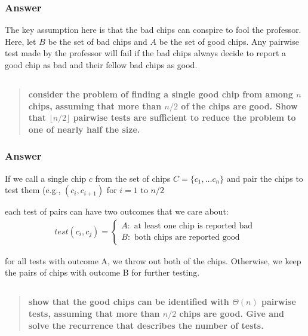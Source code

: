 \documentclass[titlepage]{article}\usepackage[]{graphicx}\usepackage[]{color}
\begin{document}
\subsubsection{Answer}
The key assumption here is that the bad chips can conspire to fool the professor.
Here, let $B$ be the set of bad chips and $A$ be the set of good chips. Any
pairwise test made by the professor will fail if the bad chips always decide to
report a good chip as bad and their fellow bad chips as good. 

  \subsection{ }
  \begin{quote}
  \textbf{consider the problem of finding a single good chip from among $n$ chips,
	assuming that more than $n/2$ of the chips are good. Show that $\lfloor n/2 \rfloor$ 
	pairwise tests are sufficient to reduce the problem to one of nearly
	half the size.}
  \end{quote}

  \subsubsection{Answer}
  If we call a single chip $c$ from the set of chips $C=\{c_1,\dots c_n\}$ and
  pair the chips to test them (e.g., $(c_i, c_{i+1})$ for $i = 1 \text{ to } n/2$

  each test of pairs can have two outcomes that we care about: 
  \begin{align*}
	  test (c_i, c_j) = \begin{cases}
		  A: \text{ at least one chip is reported bad} \\
		  B: \text{ both chips are reported good} 
	  \end{cases}
  \end{align*}

  for all tests with outcome A, we throw out both of the chips. Otherwise, we
  keep the pairs of chips with outcome B for further testing. 

  
  \subsection{}
  \begin{quote}
  \textbf{show that the good chips can be identified with $\Theta(n)$ pairwise tests,
	assuming that more than $n/2$ chips are good. Give and solve the recurrence
	that describes the number of tests. }
  \end{quote}
\end{document}

